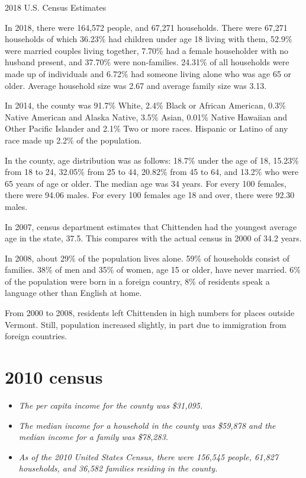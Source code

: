 2018 U.S. Census Estimates

In 2018, there were 164,572 people, and 67,271 households. There were
67,271 households of which 36.23\% had children under age 18 living with
them, 52.9\% were married couples living together, 7.70\% had a female
householder with no husband present, and 37.70\% were non-families.
24.31\% of all households were made up of individuals and 6.72\% had
someone living alone who was age 65 or older. Average household size was
2.67 and average family size was 3.13.

In 2014, the county was 91.7\% White, 2.4\% Black or African American,
0.3\% Native American and Alaska Native, 3.5\% Asian, 0.01\% Native
Hawaiian and Other Pacific Islander and 2.1\% Two or more races.
Hispanic or Latino of any race made up 2.2\% of the population.

In the county, age distribution was as follows: 18.7\% under the age of
18, 15.23\% from 18 to 24, 32.05\% from 25 to 44, 20.82\% from 45 to 64,
and 13.2\% who were 65 years of age or older. The median age was 34
years. For every 100 females, there were 94.06 males. For every 100
females age 18 and over, there were 92.30 males.

In 2007, census department estimates that Chittenden had the youngest
average age in the state, 37.5. This compares with the actual census in
2000 of 34.2 years.

In 2008, about 29\% of the population lives alone. 59\% of households
consist of families. 38\% of men and 35\% of women, age 15 or older,
have never married. 6\% of the population were born in a foreign
country, 8\% of residents speak a language other than English at home.

From 2000 to 2008, residents left Chittenden in high numbers for places
outside Vermont. Still, population increased slightly, in part due to
immigration from foreign countries.

\section{2010 census}\label{census}

\begin{itemize}
\item
  \emph{The per capita income for the county was \$31,095.}
\item
  \emph{The median income for a household in the county was \$59,878 and
  the median income for a family was \$78,283.}
\item
  \emph{As of the 2010 United States Census, there were 156,545 people,
  61,827 households, and 36,582 families residing in the county.}
\end{itemize}

